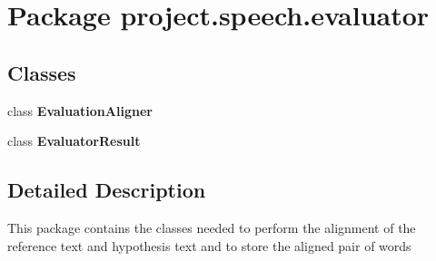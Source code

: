 \section{Package project.\+speech.\+evaluator}
\label{namespaceproject_1_1speech_1_1evaluator}
\subsection*{Classes}
\begin{DoxyCompactItemize}
\item 
class {\bf Evaluation\+Aligner}
\item 
class {\bf Evaluator\+Result}
\end{DoxyCompactItemize}


\subsection{Detailed Description}
This package contains the classes needed to perform the alignment of the reference text and hypothesis text and to store the aligned pair of words 